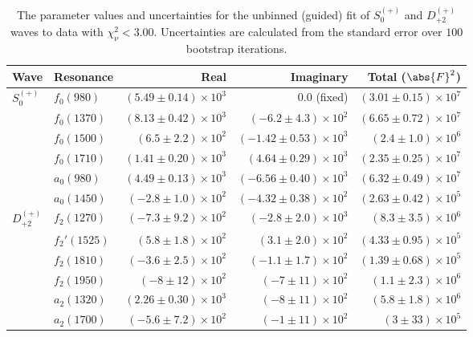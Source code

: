 \begin{table}[ht]
    \begin{center}
        \begin{tabular}{llrrr}\toprule
        Wave & Resonance & Real & Imaginary & Total ($\abs{F}^2$) \\\midrule
$S_{0}^{(+)}$ & $f_{0}(980)$ & $(5.49 \pm 0.14) \times 10^{3}$ & $0.0$ (fixed) & $(3.01 \pm 0.15) \times 10^{7}$ \\
 & $f_{0}(1370)$ & $(8.13 \pm 0.42) \times 10^{3}$ & $(-6.2 \pm 4.3) \times 10^{2}$ & $(6.65 \pm 0.72) \times 10^{7}$ \\
 & $f_{0}(1500)$ & $(6.5 \pm 2.2) \times 10^{2}$ & $(-1.42 \pm 0.53) \times 10^{3}$ & $(2.4 \pm 1.0) \times 10^{6}$ \\
 & $f_{0}(1710)$ & $(1.41 \pm 0.20) \times 10^{3}$ & $(4.64 \pm 0.29) \times 10^{3}$ & $(2.35 \pm 0.25) \times 10^{7}$ \\
 & $a_{0}(980)$ & $(4.49 \pm 0.13) \times 10^{3}$ & $(-6.56 \pm 0.40) \times 10^{3}$ & $(6.32 \pm 0.49) \times 10^{7}$ \\
 & $a_{0}(1450)$ & $(-2.8 \pm 1.0) \times 10^{2}$ & $(-4.32 \pm 0.38) \times 10^{2}$ & $(2.63 \pm 0.42) \times 10^{5}$ \\
$D_{+2}^{(+)}$ & $f_{2}(1270)$ & $(-7.3 \pm 9.2) \times 10^{2}$ & $(-2.8 \pm 2.0) \times 10^{3}$ & $(8.3 \pm 3.5) \times 10^{6}$ \\
 & $f_{2}'(1525)$ & $(5.8 \pm 1.8) \times 10^{2}$ & $(3.1 \pm 2.0) \times 10^{2}$ & $(4.33 \pm 0.95) \times 10^{5}$ \\
 & $f_{2}(1810)$ & $(-3.6 \pm 2.5) \times 10^{2}$ & $(-1.1 \pm 1.7) \times 10^{2}$ & $(1.39 \pm 0.68) \times 10^{5}$ \\
 & $f_{2}(1950)$ & $(-8 \pm 12) \times 10^{2}$ & $(-7 \pm 11) \times 10^{2}$ & $(1.1 \pm 2.3) \times 10^{6}$ \\
 & $a_{2}(1320)$ & $(2.26 \pm 0.30) \times 10^{3}$ & $(-8 \pm 11) \times 10^{2}$ & $(5.8 \pm 1.8) \times 10^{6}$ \\
 & $a_{2}(1700)$ & $(-5.6 \pm 7.2) \times 10^{2}$ & $(-1 \pm 11) \times 10^{2}$ & $(3 \pm 33) \times 10^{5}$ \\\bottomrule
        \end{tabular}
    \caption{The parameter values and uncertainties for the unbinned (guided) fit of $S_{0}^{(+)}$ and $D_{+2}^{(+)}$ waves to data with $\chi^2_\nu < 3.00$. Uncertainties are calculated from the standard error over $100$ bootstrap iterations.}\label{tab:unbinned-fit-chisqdof-3.0-guided-Sp0p-Dp2p}
    \end{center}
\end{table}
